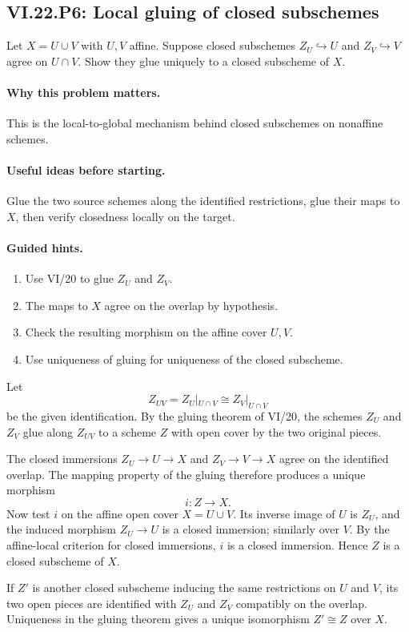 \subsection*{VI.22.P6: Local gluing of closed subschemes}
\begin{problem}\label{prob:vi22-p06}
Let $X=U\cup V$ with $U,V$ affine.  Suppose closed subschemes $Z_U\hookrightarrow U$ and $Z_V\hookrightarrow V$ agree on $U\cap V$.  Show they glue uniquely to a closed subscheme of $X$.
\end{problem}

\ifdefined\FullProblemDossiers
\paragraph{Why this problem matters.}
This is the local-to-global mechanism behind closed subschemes on nonaffine schemes.

\paragraph{Useful ideas before starting.}
Glue the two source schemes along the identified restrictions, glue their maps to $X$, then verify closedness locally on the target.

\paragraph{Guided hints.}
\begin{enumerate}
\item Use VI/20 to glue $Z_U$ and $Z_V$.
\item The maps to $X$ agree on the overlap by hypothesis.
\item Check the resulting morphism on the affine cover $U,V$.
\item Use uniqueness of gluing for uniqueness of the closed subscheme.
\end{enumerate}

\begin{solution}
Let
\[
 Z_{UV}=Z_U|_{U\cap V}\cong Z_V|_{U\cap V}
\]
be the given identification.  By the gluing theorem of VI/20, the schemes $Z_U$ and $Z_V$
glue along $Z_{UV}$ to a scheme $Z$ with open cover by the two original pieces.

The closed immersions $Z_U\to U\to X$ and $Z_V\to V\to X$ agree on the identified overlap.
The mapping property of the gluing therefore produces a unique morphism
\[
 i:Z\longrightarrow X.
\]
Now test $i$ on the affine open cover $X=U\cup V$.  Its inverse image of $U$ is $Z_U$, and
the induced morphism $Z_U\to U$ is a closed immersion; similarly over $V$.  By the affine-local
criterion for closed immersions, $i$ is a closed immersion.  Hence $Z$ is a closed subscheme
of $X$.

If $Z'$ is another closed subscheme inducing the same restrictions on $U$ and $V$, its two
open pieces are identified with $Z_U$ and $Z_V$ compatibly on the overlap.  Uniqueness in the
gluing theorem gives a unique isomorphism $Z'\cong Z$ over $X$.
\end{solution}

